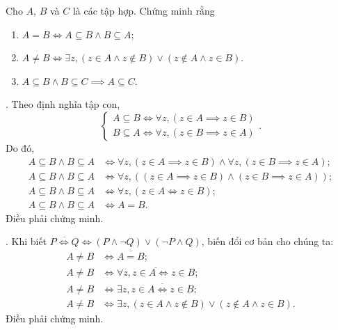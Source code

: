 \exercise Cho $A$, $B$ và $C$ là các tập hợp. Chứng minh rằng
\begin{enumerate}
    \item $A = B \iff A \subseteq B \land B \subseteq A$;
    \item $A \neq B \iff \exists z, (z \in A \land z \notin B) \lor (z \notin A \land z \in B)$.
    \item $A \subseteq B \land B \subseteq C \implies A \subseteq C$.
\end{enumerate}

\solution

\setcounter{subexercise}{1}
. Theo định nghĩa tập con,
\begin{equation*}
    \begin{cases}
        A \subseteq B \iff \forall z, (z \in A \implies z \in B) \\
        B \subseteq A \iff \forall z, (z \in B \implies z \in A)
    \end{cases}.
\end{equation*}
Do đó,
\begin{align*}
    A \subseteq B \land B \subseteq A & \iff \forall z, (z \in A \implies z \in B) \land \forall z, (z \in B \implies z \in A);    \\
    A \subseteq B \land B \subseteq A & \iff \forall z, \left( (z \in A \implies z \in B) \land (z \in B \implies z \in A)\right); \\
    A \subseteq B \land B \subseteq A & \iff \forall z, \left(z \in A \iff z \in B\right);                                         \\
    A \subseteq B \land B \subseteq A & \iff A = B.
\end{align*}
Điều phải chứng minh.

. Khi biết $\overline{P \iff Q} \iff (P \land \neg Q) \lor (\neg P \land Q)$, biến đổi cơ bản cho chúng ta:
\begin{align*}
    A \neq B & \iff \overline{A = B};                                                                                \\
    A \neq B & \iff \overline{\forall z, z \in A \iff z \in B};                                                      \\
    A \neq B & \iff \exists z, \overline{z \in A \iff z \in B};                                                      \\
    A \neq B & \iff \exists z, \left( z \in A \land z \notin B \right) \lor \left( z \notin A \land z \in B \right).
\end{align*}
Điều phải chứng minh.

